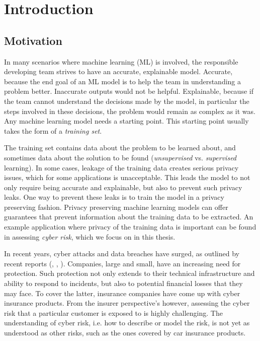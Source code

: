 \chapter{Introduction}

\section{Motivation}

In many scenarios where machine learning (ML) is involved, the responsible developing team strives to have an accurate, explainable model. Accurate, because the end goal of an ML model is to help the team in understanding a problem better. Inaccurate outputs would not be helpful. Explainable, because if the team cannot understand the decisions made by the model, in particular the steps involved in these decisions, the problem would remain as complex as it was. Any machine learning model needs a starting point. This starting point usually takes the form of a \textit{training set}. 

The training set contains data about the problem to be learned about, and sometimes data about the solution to be found (\textit{unsupervised} vs. \textit{supervised} learning). In some cases, leakage of the training data creates serious privacy issues, which for some applications is unacceptable. This leads the model to not only require being accurate and explainable, but also to prevent such privacy leaks. One way to prevent these leaks is to train the model in a privacy preserving fashion. Privacy preserving machine learning models can offer guarantees that prevent information about the training data to be extracted. An example application where privacy of the training data is important can be found in assessing \textit{cyber risk}, which we focus on in this thesis.

In recent years, cyber attacks and data breaches have surged, as outlined by recent reports (\cite{verizon_report}, \cite{ibm_report}, \cite{cisco_report}). Companies, large and small, have an increasing need for protection. Such protection not only extends to their technical infrastructure and ability to respond to incidents, but also to potential financial losses that they may face. To cover the latter, insurance companies have come up with cyber insurance products. From the insurer perspective's however, assessing the cyber risk that a particular customer is exposed to is highly challenging. The understanding of cyber risk, i.e. how to describe or model the risk, is not yet as understood as other risks, such as the ones covered by car insurance products.

